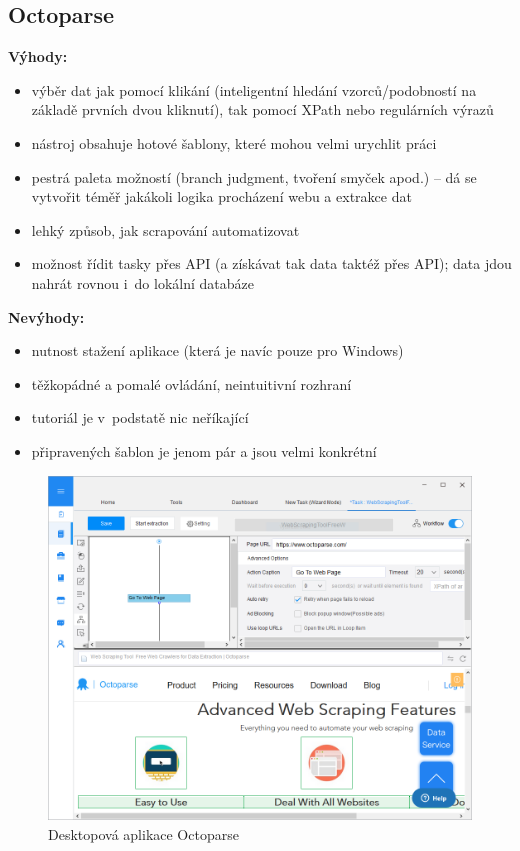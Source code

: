 \documentclass[thesis=B,czech]{FITthesis}[2012/06/26]
\begin{document}
\subsection{Octoparse}
\textbf{Výhody:}
\begin{itemize}
	\item výběr dat jak pomocí klikání (inteligentní hledání vzorců/podobností na základě prvních dvou kliknutí), tak pomocí XPath nebo regulárních výrazů
	\item nástroj obsahuje hotové šablony, které mohou velmi urychlit práci
	\item pestrá paleta možností (branch judgment, tvoření smyček apod.) -- dá se vytvořit téměř jakákoli logika procházení webu a extrakce dat
	\item lehký způsob, jak scrapování automatizovat
	\item možnost řídit tasky přes API (a získávat tak data taktéž přes API); data jdou nahrát rovnou i~do lokální databáze
\end{itemize}
\textbf{Nevýhody:}
\begin{itemize}
	\item nutnost stažení aplikace (která je navíc pouze pro Windows)
	\item těžkopádné a pomalé ovládání, neintuitivní rozhraní
	\item tutoriál je v~podstatě nic neříkající
	\item připravených šablon je jenom pár a jsou velmi konkrétní
\end{itemize}
\begin{figure}[h]
	\includegraphics[width=\linewidth]{images/Octoparse.png}
	\caption[Desktopová aplikace Octoparse]{Desktopová aplikace Octoparse~\cite[snímek pořídil autor]{octoparse}}
	\label{fig:octoparse}
\end{figure}
\end{document}
